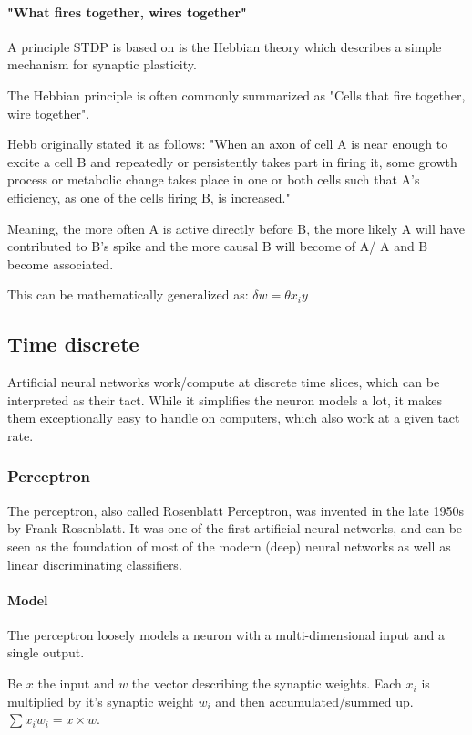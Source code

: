 \paragraph{"What fires together, wires together"} A principle STDP is based on is the Hebbian theory which describes a simple mechanism for synaptic plasticity.

The Hebbian principle is often commonly summarized as "Cells that fire together, wire together".

Hebb originally stated it as follows: "When an axon of cell A is near enough to excite a cell B and repeatedly or persistently takes part in firing it, some growth process or metabolic change takes place in one or both cells such that A's efficiency, as one of the cells firing B, is increased."

Meaning, the more often A is active directly before B, the more likely A will have contributed to B's spike and the more causal B will become of A/ A and B become associated.

This can be mathematically generalized as: $\delta w = \theta x_i y $ 


\subsection{Time discrete}

Artificial neural networks work/compute at discrete time slices, which can be interpreted as their tact.
While it simplifies the neuron models a lot, it makes them exceptionally easy to handle on computers, which also work at a given tact rate.

\subsubsection{Perceptron}

The perceptron, also called Rosenblatt Perceptron, was invented in the late 1950s by Frank Rosenblatt. 
It was one of the first artificial neural networks, and can be seen as the foundation of most of the modern (deep) neural networks as well as linear discriminating classifiers. 

\paragraph{Model}

The perceptron loosely models a neuron with a multi-dimensional input and a single output. 

Be $x$ the input and $w$ the vector describing the synaptic weights. 
Each $x_i$ is multiplied by it's synaptic weight $w_i$ and then accumulated/summed up.
$\sum x_i w_i = x \times w$.

